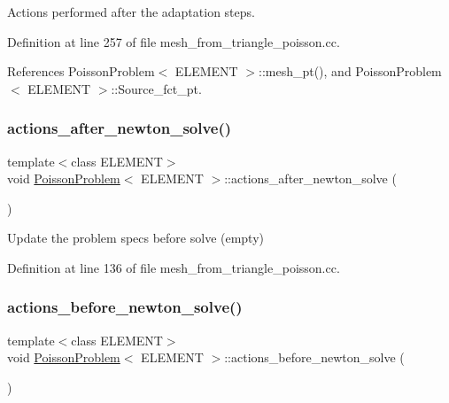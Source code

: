 Actions performed after the adaptation steps. 



Definition at line 257 of file mesh\+\_\+from\+\_\+triangle\+\_\+poisson.\+cc.



References Poisson\+Problem$<$ E\+L\+E\+M\+E\+N\+T $>$\+::mesh\+\_\+pt(), and Poisson\+Problem$<$ E\+L\+E\+M\+E\+N\+T $>$\+::\+Source\+\_\+fct\+\_\+pt.

\mbox{\label{classPoissonProblem_a7a9478d8e1e5c7d3a886b00ab7d50bbd}} 
\subsubsection{\texorpdfstring{actions\+\_\+after\+\_\+newton\+\_\+solve()}{actions\_after\_newton\_solve()}}
{\footnotesize\ttfamily template$<$class E\+L\+E\+M\+E\+NT$>$ \\
void \hyperlink{classPoissonProblem}{Poisson\+Problem}$<$ E\+L\+E\+M\+E\+NT $>$\+::actions\+\_\+after\+\_\+newton\+\_\+solve (\begin{DoxyParamCaption}{ }\end{DoxyParamCaption})\hspace{0.3cm}{\ttfamily [inline]}}



Update the problem specs before solve (empty) 



Definition at line 136 of file mesh\+\_\+from\+\_\+triangle\+\_\+poisson.\+cc.

\mbox{\label{classPoissonProblem_a398608a5ff73b74c5a387b3f794c58df}} 
\subsubsection{\texorpdfstring{actions\+\_\+before\+\_\+newton\+\_\+solve()}{actions\_before\_newton\_solve()}}
{\footnotesize\ttfamily template$<$class E\+L\+E\+M\+E\+NT$>$ \\
void \hyperlink{classPoissonProblem}{Poisson\+Problem}$<$ E\+L\+E\+M\+E\+NT $>$\+::actions\+\_\+before\+\_\+newton\+\_\+solve (\begin{DoxyParamCaption}{ }\end{DoxyParamCaption})\hspace{0.3cm}{\ttfamily [inline]}}



